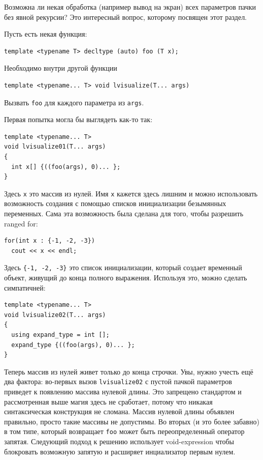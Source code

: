 \documentclass[a4paper,12pt,oneside]{article}
\begin{document}
Возможна ли некая обработка (например вывод на экран) всех параметров пачки без явной рекурсии? Это интересный вопрос, которому посвящен этот раздел.

Пусть есть некая функция:

\begin{lstlisting}
template <typename T> decltype (auto) foo (T x);
\end{lstlisting}

Необходимо внутри другой функции 

\begin{lstlisting}
template <typename... T> void lvisualize(T... args)
\end{lstlisting}

Вызвать \lstinline!foo! для каждого параметра из \lstinline!args!.

Первая попытка могла бы выглядеть как-то так:

\begin{lstlisting}
template <typename... T>
void lvisualize01(T... args)
{
  int x[] {((foo(args), 0)... };
}
\end{lstlisting}

Здесь \lstinline!x! это массив из нулей. Имя \lstinline!x! кажется здесь лишним и можно использовать возможность создания с помощью списков инициализации безымянных переменных. Сама эта возможность была сделана для того, чтобы разрешить ranged for:

\begin{lstlisting}
for(int x : {-1, -2, -3})
  cout << x << endl;
\end{lstlisting}

Здесь \lstinline!{-1, -2, -3}! это список инициализации, который создает временный объект, живущий до конца полного выражения. Используя это, можно сделать симпатичней:

\begin{lstlisting}
template <typename... T>
void lvisualize02(T... args)
{
  using expand_type = int [];
  expand_type {((foo(args), 0)... };
}
\end{lstlisting}

Теперь массив из нулей живет только до конца строчки. Увы, нужно учесть ещё два фактора: во-первых вызов \lstinline!lvisualize02! с пустой пачкой параметров приведет к появлению массива нулевой длины. Это запрещено стандартом и рассмотренная выше магия здесь не сработает, потому что никакая синтаксическая конструкция не сломана. Массив нулевой длины объявлен правильно, просто такие массивы не допустимы. Во вторых (и это более забавно) в том типе, который возвращает \lstinline!foo! может быть переопределенный оператор запятая. Следующий подход к решению использует void-expression чтобы блокровать возможную запятую и расширяет инциализатор первым нулем.
\end{document}
